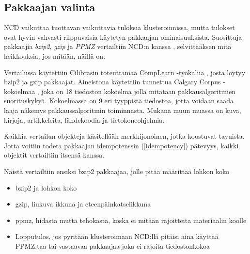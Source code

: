 \documentclass[12pt,finnish]{tktltiki2}
\theoremstyle{definition}
\theoremstyle{remark}
\begin{document}

  \subsection{Pakkaajan valinta} %
  \label{sub:pakkaajan_valinta}

      NCD vaikuttaa tuottavan vaikuttavia tuloksia klusteroinnissa, mutta tulokset ovat hyvin vahvasti riippuvaisia käytetyn pakkaajan ominaisuuksista.
      Suosittuja pakkaajia \emph{bzip2}, \emph{gzip} ja \emph{PPMZ} vertailtiin NCD:n kanssa \cite{cebrian2005common}, selvittääksen mitä heikkouksia, jos mitään, näillä on.


      Vertailussa käytettiin Cilibrasin toteuttamaa CompLearn -työkalua \cite{complearn}, josta löytyy bzip2 ja gzip pakkaajat. Aineistona käytettiin tunnettua Calgary Corpus -kokoelmaa \cite{calgarycorpus}, joka on 18 tiedoston kokoelma jolla mitataan pakkausalgoritmien suorituskykyä. Kokoelmassa on 9 eri tyyppistä tiedostoa, jotta voidaan saada laaja näkemys pakkaussalgoritmin toiminnasta. Mukana muun muassa on kuva, kirjoja, artikkeleita, lähdekoodia ja tietokoneohjelmia.

      Kaikkia vertailun objekteja käsitellään merkkijonoinen, jotka koostuvat tavuista. Jotta voitiin todeta pakkaajan idempotenssin (\ref{idempotency}) pätevyys, kaikki objektit vertailtiin itsensä kanssa.

      Näistä vertailtiin ensiksi bzip2 pakkaajaa, jolle pitää määrittää lohkon koko

    \begin{itemize}
      \item bzip2 ja lohkon koko
      \item gzip, liukuva ikkuna ja eteenpäinkatselikkuna
      \item ppmz, hidasta mutta tehokasta, koska ei mitään rajoitteita materiaalin koolle
      \item Lopputulos, jos pyritään klusteroimaan NCD:llä pitäisi aina käyttää PPMZ:taa tai vastaavaa pakkaajaa joka ei rajoita tiedostonkokoa
    \end{itemize}
\end{document}
